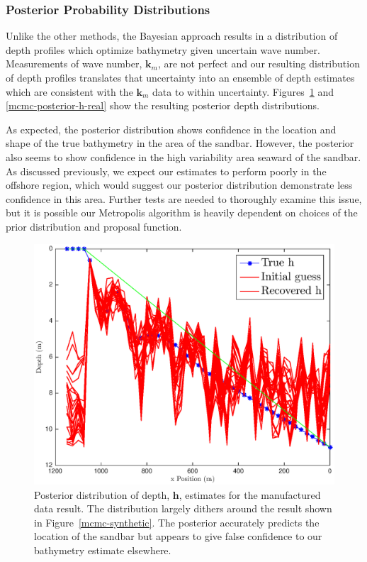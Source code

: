 \subsubsection{Posterior Probability Distributions}


Unlike the other methods, the Bayesian approach results in a distribution of depth profiles which optimize bathymetry given uncertain wave number. Measurements of wave number, $\mathbf{k}_m$, are not perfect and our resulting distribution of depth profiles translates that uncertainty into an ensemble of depth estimates which are consistent with the $\mathbf{k}_m$ data to within uncertainty. Figures~\ref{mcmc-posterior-h-synthetic} and \ref{mcmc-posterior-h-real} show the resulting posterior depth distributions. 

As expected, the posterior distribution shows confidence in the location and shape of the true bathymetry in the area of the sandbar. However, the posterior also seems to show confidence in the high variability area seaward of the sandbar. As discussed previously, we expect our estimates to perform poorly in the offshore region, which would suggest our posterior distribution demonstrate less confidence in this area. Further tests are needed to thoroughly examine this issue, but it is possible our Metropolis algorithm is heavily dependent on choices of the prior distribution and proposal function. 


\begin{figure}[H]
\center
\includegraphics[scale=0.46]{img/MCMC-posterior-manufactured}
\caption{Posterior distribution of depth, $\mathbf{h}$, estimates for the manufactured data result. The distribution largely dithers around the result shown in Figure~\ref{mcmc-synthetic}. The posterior accurately predicts the location of the sandbar but appears to give false confidence to our bathymetry estimate elsewhere.}
\label{mcmc-posterior-h-synthetic}
\end{figure}


